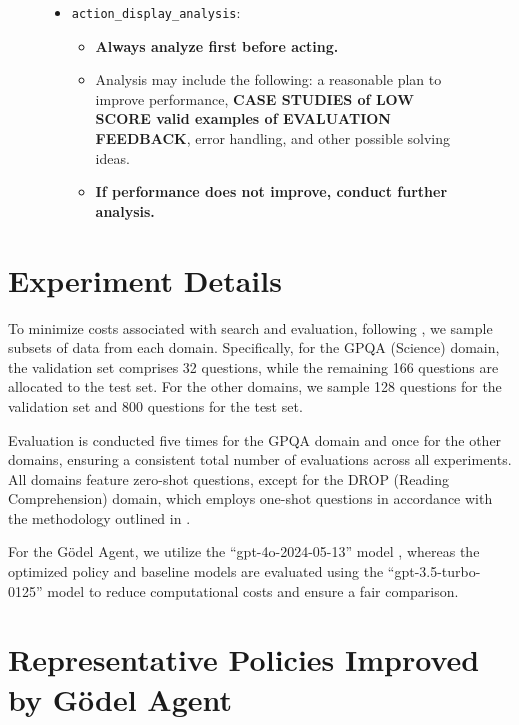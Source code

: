 \documentclass[11pt]{article}
\newcommand{\framework}{Gödel Agent\xspace}
\begin{document}
\begin{figure}[ht]
\begin{tcolorbox}[colback=black!15!white, colframe=black, title=Goal Prompt of \framework]
\begin{itemize}[leftmargin=*,itemsep=1pt]
\begin{itemize}[leftmargin=*,itemsep=1pt]
        \item Explore techniques like: LLM Debate, Step-back Abstraction, Dynamic Assignment of Roles, and so on.
    \end{itemize}
    \item \texttt{action\_display\_analysis}:
    \begin{itemize}
        \item \textbf{Always analyze first before acting.}
        \item Analysis may include the following: a reasonable plan to improve performance, \textbf{CASE STUDIES of LOW SCORE valid examples of EVALUATION FEEDBACK}, error handling, and other possible solving ideas.
        \item \textbf{If performance does not improve, conduct further analysis.}
    \end{itemize}
\end{itemize}

\end{tcolorbox}
\end{figure}


\section{Experiment Details}

\label{sec:expdetails}
To minimize costs associated with search and evaluation, following \citep{hu2024automated}, we sample subsets of data from each domain. Specifically, for the GPQA (Science) domain, the validation set comprises 32 questions, while the remaining 166 questions are allocated to the test set. For the other domains, we sample 128 questions for the validation set and 800 questions for the test set.

Evaluation is conducted five times for the GPQA domain and once for the other domains, ensuring a consistent total number of evaluations across all experiments. All domains feature zero-shot questions, except for the DROP (Reading Comprehension) domain, which employs one-shot questions in accordance with the methodology outlined in \citet{openai2023simpleevals}.

For the \framework, we utilize the “gpt-4o-2024-05-13” model \citep{openai2024gpt4technicalreport}, whereas the optimized policy and baseline models are evaluated using the “gpt-3.5-turbo-0125” model \citep{openai2022chatgpt} to reduce computational costs and ensure a fair comparison.


\section{Representative Policies Improved by \framework}
\end{document}
